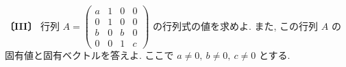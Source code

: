 \noindent\textbf{〔III〕}
行列 $A=\begin{pmatrix}
a & 1 & 0 & 0\\
0 & 1 & 0 & 0\\
b & 0 & b & 0\\
0 & 0 & 1 & c
\end{pmatrix}$ の行列式の値を求めよ. また, この行列 $A$ の固有値と固有ベクトルを答えよ.
ここで $a\ne 0,\ b\ne 0,\ c\ne 0$ とする.

